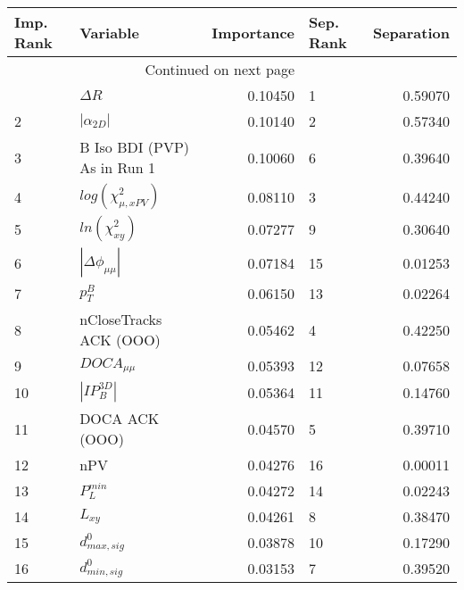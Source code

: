 \usepackage{lscape}

\begin{landscape}
\begin{longtable}{llrlr}
\toprule
Imp. Rank &                     Variable &  Importance & Sep. Rank &  Separation \\
\midrule
\endhead
\midrule
\multicolumn{3}{r}{{Continued on next page}} \\
\midrule
\endfoot

\bottomrule
\endlastfoot
        1 &                   $\Delta R$ &     0.10450 &         1 &     0.59070 \\
        2 &              $|\alpha_{2D}|$ &     0.10140 &         2 &     0.57340 \\
        3 &  B Iso BDI (PVP) As in Run 1 &     0.10060 &         6 &     0.39640 \\
        4 &    $log(\chi^{2}_{\mu,xPV})$ &     0.08110 &         3 &     0.44240 \\
        5 &          $ln(\chi^{2}_{xy})$ &     0.07277 &         9 &     0.30640 \\
        6 &     $|\Delta \phi_{\mu\mu}|$ &     0.07184 &        15 &     0.01253 \\
        7 &                    $p^B_{T}$ &     0.06150 &        13 &     0.02264 \\
        8 &       nCloseTracks ACK (OOO) &     0.05462 &         4 &     0.42250 \\
        9 &              $DOCA_{\mu\mu}$ &     0.05393 &        12 &     0.07658 \\
       10 &              $|IP_{B}^{3D}|$ &     0.05364 &        11 &     0.14760 \\
       11 &               DOCA ACK (OOO) &     0.04570 &         5 &     0.39710 \\
       12 &                          nPV &     0.04276 &        16 &     0.00011 \\
       13 &                $P^{min}_{L}$ &     0.04272 &        14 &     0.02243 \\
       14 &                     $L_{xy}$ &     0.04261 &         8 &     0.38470 \\
       15 &             $d^0_{max, sig}$ &     0.03878 &        10 &     0.17290 \\
       16 &             $d^0_{min, sig}$ &     0.03153 &         7 &     0.39520 \\
\end{longtable}

\end{landscape}
